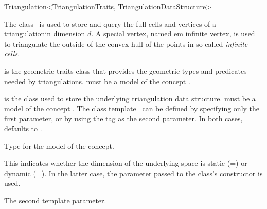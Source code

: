 \begin{ccRefClass}{Triangulation<TriangulationTraits, TriangulationDataStructure>}

\ccDefinition

The class \ccRefName\ is used to store and query the full cells and vertices of
a triangulationin dimension $d$. A special vertex, named
{em infinite vertex}, is used to triangulate the  outside of the convex
hull of the points in so called {\em infinite cells}.


\ccParameters

 is the geometric traits class that provides the geometric types
and predicates needed by triangulations.  must be a model of the
concept .

 is the class used to store the underlying triangulation data
structure.  must be a model of the concept
. The class template \ccRefName\ can
be defined  by specifying only the first parameter, or by using the
tag  as
the second parameter. In both cases,  defaults to
.

\ccTypes
{}

%
{Type for the model of the  concept.}


%
{This indicates whether the dimension of the underlying space is static
(=\ccGlobalScope{}) or
dynamic (=\ccGlobalScope{}).
In the latter case, the  parameter passed to the class's constructor
is used.}

%
{The second template parameter.}





\end{ccRefClass}
